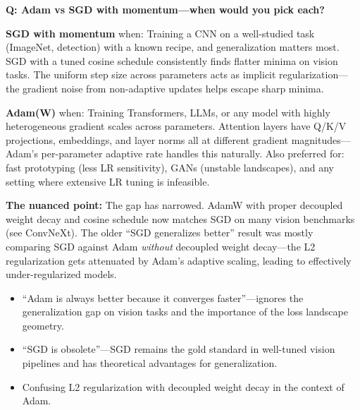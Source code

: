 \begin{interviewq}
\textbf{Q: Adam vs SGD with momentum---when would you pick each?}

 \quad {} \quad \badgefreq{\freqhigh}

\stronganswer

\textbf{SGD with momentum} when: Training a CNN on a well-studied task (ImageNet, detection) with a known recipe, and generalization matters most. SGD with a tuned cosine schedule consistently finds flatter minima on vision tasks. The uniform step size across parameters acts as implicit regularization---the gradient noise from non-adaptive updates helps escape sharp minima.

\textbf{Adam(W)} when: Training Transformers, LLMs, or any model with highly heterogeneous gradient scales across parameters. Attention layers have Q/K/V projections, embeddings, and layer norms all at different gradient magnitudes---Adam's per-parameter adaptive rate handles this naturally. Also preferred for: fast prototyping (less LR sensitivity), GANs (unstable landscapes), and any setting where extensive LR tuning is infeasible.

\textbf{The nuanced point:} The gap has narrowed. AdamW with proper decoupled weight decay and cosine schedule now matches SGD on many vision benchmarks (see ConvNeXt). The older ``SGD generalizes better'' result was mostly comparing SGD against Adam \textit{without} decoupled weight decay---the L2 regularization gets attenuated by Adam's adaptive scaling, leading to effectively under-regularized models.

\redflags
\begin{itemize}
    \item ``Adam is always better because it converges faster''---ignores the generalization gap on vision tasks and the importance of the loss landscape geometry.
    \item ``SGD is obsolete''---SGD remains the gold standard in well-tuned vision pipelines and has theoretical advantages for generalization.
    \item Confusing L2 regularization with decoupled weight decay in the context of Adam.
\end{itemize}



\end{interviewq}
